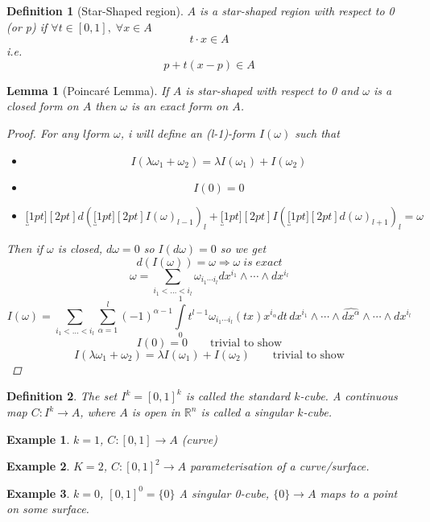 \documentclass[11pt]{article}
\def\RR{\mathbb{R}}
\newtheorem{lemma}[theorem]{Lemma}
\newtheorem{definition}{Definition}[section]
\newtheorem{example}{Example}[section]
\begin{document}
\begin{definition}[Star-Shaped region]  
$A$ is a star-shaped region with respect to 0 (or p) if  $\forall t \in [0,1], \; \forall x \in A$
 \[t\cdot x \in A\]
i.e.\[p +t(x-p) \in A\]
\end{definition}

\begin{lemma}[Poincar\'{e} Lemma]
If $A$ is star-shaped with respect to 0 and $\omega$ is a closed form on $A$ then $\omega$ is an exact form on $A$. 
\begin{proof}
For any $l$form $\omega$, i will define an (l-1)-form $I(\omega)$ such that 
\begin{itemize}
\item \[I(\lambda\omega_1 + \omega_2) = \lambda I(\omega_1) + I(\omega_2)\]
\item \[I(0) =0\]
\item \[\underbracket[1pt][2pt]{d(\underbracket[1pt][2pt]{I(\omega)}_{l-1})}_{l} +\underbracket[1pt][2pt]{I(\underbracket[1pt][2pt]{d(\omega)}_{l+1})}_{l} = \omega\]
\end{itemize}
Then if $\omega$ is closed, $d\omega =0$ so $I(d\omega)=0$ so we get 
\[d(I(\omega)) = \omega \Rightarrow \omega \; is \; exact\]
\[\omega = \sum\limits_{i_1<\dots <i_l}\omega_{i_1\cdots i_l}dx^{i_1}\wedge\cdots\wedge dx^{i_l}\]
\[I(\omega) = \sum\limits_{i_1<\dots <i_l}\sum\limits_{\alpha=1}^{l}(-1)^{\alpha-1}\int\limits_{0}^1 t^{l-1}\omega_{i_1\cdots i_l}(tx)x^{i_\alpha}dt\, dx^{i_1}\wedge\cdots\wedge \hat{dx^{\alpha}}\wedge\cdots\wedge dx^{i_l}\]
\[I(0)=0 \qquad \text{trivial to show}\]
\[I(\lambda\omega_1 + \omega_2) = \lambda I(\omega_1) + I(\omega_2) \qquad \text{trivial to show}\]
\end{proof}
\end{lemma}

\begin{definition}
The set $I^k=[0,1]^k$ is called the standard $k$-cube. A continuous map $C:I^k \rightarrow A$, where $A$ is open in $\RR^n$ is called a singular $k$-cube. 
\end{definition}

\begin{example}
$k=1$, $C:[0,1] \rightarrow A$ (curve)
\end{example}

\begin{example}
$K=2$, $C:[0,1]^2 \rightarrow A$ parameterisation of a curve/surface.
\end{example}

\begin{example}$k=0$, $[0,1]^0 = \{0\}$ A singular 0-cube, $\{0\} \rightarrow A$ maps to a point on some surface. 
\end{example}
\end{document}
